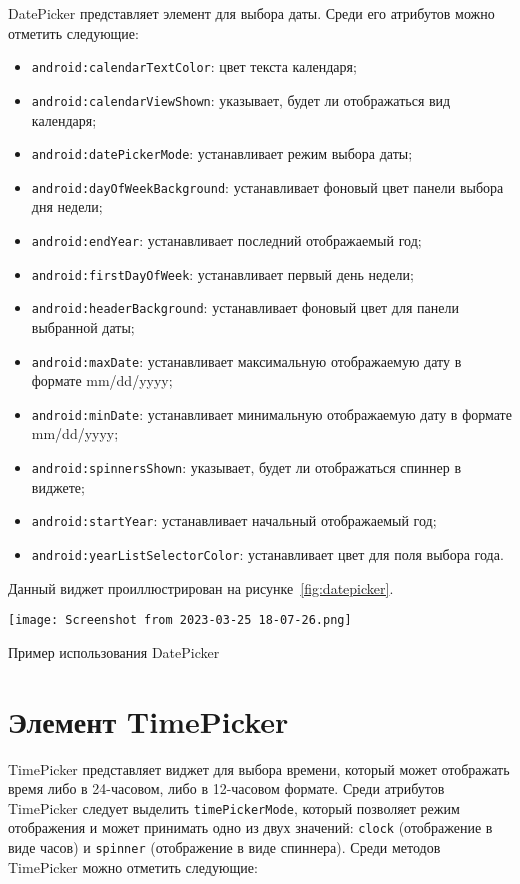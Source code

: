 DatePicker представляет элемент для выбора даты. Среди его атрибутов 
можно отметить следующие:
\begin{itemize}
	\item \texttt{android:calendarTextColor}: цвет текста календаря;
	\item \texttt{android:calendarViewShown}: указывает, будет ли
		отображаться вид календаря;
	\item \texttt{android:datePickerMode}: устанавливает режим выбора даты;
	\item \texttt{android:dayOfWeekBackground}: устанавливает фоновый цвет
		панели выбора дня недели;
	\item \texttt{android:endYear}: устанавливает последний отображаемый год;
	\item \texttt{android:firstDayOfWeek}: устанавливает первый день недели;
	\item \texttt{android:headerBackground}: устанавливает фоновый цвет
		для панели выбранной даты;
	\item \texttt{android:maxDate}: устанавливает максимальную отображаемую
		дату в формате mm/dd/yyyy;
	\item \texttt{android:minDate}: устанавливает минимальную отображаемую
		дату в формате mm/dd/yyyy;
	\item \texttt{android:spinnersShown}: указывает, будет ли отображаться
		спиннер в виджете;
	\item \texttt{android:startYear}: устанавливает начальный
		отображаемый год;
	\item \texttt{android:yearListSelectorColor}: устанавливает цвет для
		поля выбора года.
\end{itemize}

Данный виджет проиллюстрирован на рисунке~\ref{fig:datepicker}.

\begin{image}
	\texttt{[image: Screenshot from 2023-03-25 18-07-26.png]}
	\caption{Пример использования DatePicker}
	\label{fig:datepicker}
\end{image}

\section{Элемент TimePicker}
TimePicker представляет виджет для выбора времени, который может 
отображать время либо в 24-часовом, либо в 12-часовом формате. Среди 
атрибутов TimePicker следует выделить \texttt{timePickerMode},
который позволяет режим отображения и может принимать одно из двух значений:
\texttt{clock} (отображение в виде часов) и
\texttt{spinner} (отображение в виде спиннера).
Среди методов TimePicker можно отметить следующие:

